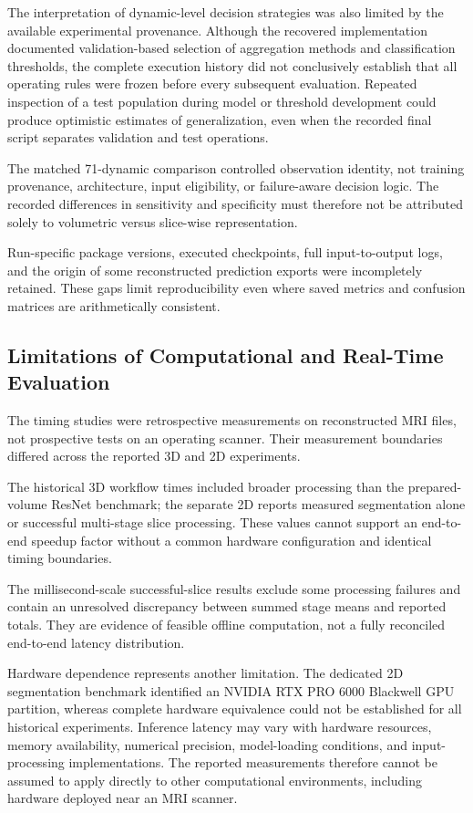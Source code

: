 The interpretation of dynamic-level decision strategies was also limited by the available experimental provenance. Although the recovered implementation documented validation-based selection of aggregation methods and classification thresholds, the complete execution history did not conclusively establish that all operating rules were frozen before every subsequent evaluation. Repeated inspection of a test population during model or threshold development could produce optimistic estimates of generalization, even when the recorded final script separates validation and test operations.

The matched 71-dynamic comparison controlled observation identity, not training provenance, architecture, input eligibility, or failure-aware decision logic. The recorded differences in sensitivity and specificity must therefore not be attributed solely to volumetric versus slice-wise representation.

Run-specific package versions, executed checkpoints, full input-to-output logs, and the origin of some reconstructed prediction exports were incompletely retained. These gaps limit reproducibility even where saved metrics and confusion matrices are arithmetically consistent.

\subsection{Limitations of Computational and Real-Time Evaluation}

The timing studies were retrospective measurements on reconstructed MRI files, not prospective tests on an operating scanner. Their measurement boundaries differed across the reported 3D and 2D experiments.

The historical 3D workflow times included broader processing than the prepared-volume ResNet benchmark; the separate 2D reports measured segmentation alone or successful multi-stage slice processing. These values cannot support an end-to-end speedup factor without a common hardware configuration and identical timing boundaries.

The millisecond-scale successful-slice results exclude some processing failures and contain an unresolved discrepancy between summed stage means and reported totals. They are evidence of feasible offline computation, not a fully reconciled end-to-end latency distribution.

Hardware dependence represents another limitation. The dedicated 2D segmentation benchmark identified an NVIDIA RTX PRO 6000 Blackwell GPU partition, whereas complete hardware equivalence could not be established for all historical experiments. Inference latency may vary with hardware resources, memory availability, numerical precision, model-loading conditions, and input-processing implementations. The reported measurements therefore cannot be assumed to apply directly to other computational environments, including hardware deployed near an MRI scanner.

